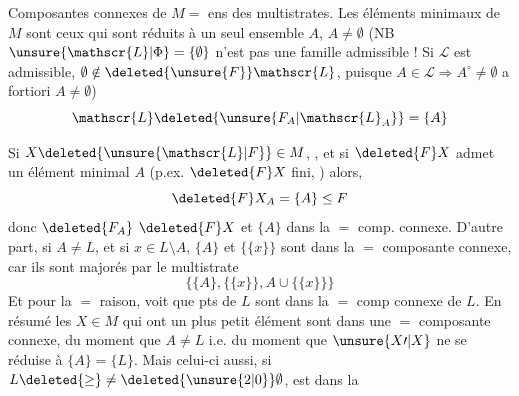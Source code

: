 
Composantes connexes de $M=$ ens des multistrates. Les éléments minimaux de $M$ sont ceux qui sont réduits à un seul ensemble $A$,  $A\ne\emptyset$ (NB $\unsure{\mathscr{L}|\Phi}=\{\emptyset\}$ n'est pas une famille admissible !\deleted{)} Si $\mathscr{L}$ est admissible, $\emptyset\notin\deleted{\unsure{F}}\mathscr{L}$, \deleted{)} puisque $A\in\mathscr{L}\Rightarrow A^{\circ}\ne\emptyset$ a fortiori $A\ne\emptyset$)
\[
\mathscr{L}\deleted{\unsure{F_{A}|\mathscr{L}_{A}}}=\{A\}
\]

 

Si $X\deleted{\unsure{\mathscr{L}|F}}\in M$,  , et si $\deleted{F}X$ admet un  élément minimal $A$ (p.ex. $\deleted{F}X$ fini, ) alors,
\[
\deleted{F}X_A=\{A\}\leq F
\]
 donc $\deleted{F_A}$  $\deleted{F}X$ et $\{A\}$ dans la $=$ comp. connexe. D'autre part,  si $A\ne L$, et si $x\in L\setminus A$, $\{A\}$ et $\{\{x\}\}$ sont dans la $=$ composante connexe, car ils sont majorés par le multistrate
\[
\bigl\{\{A\},\{\{x\}\},A\cup\{\{x\}\}\bigr\}
\]
 Et pour la $=$ raison,    voit que   pts de $L$ sont dans la $=$ comp connexe de $L$. En résumé les $X\in M$ qui ont un plus petit élément  sont dans une $=$ composante connexe, du moment que $A\ne L$ i.e. du moment que $\unsure{X\prime|X}$ ne se réduise à $\{A\}=\{L\}$. Mais celui-ci aussi, si  $L\deleted{\geq}\ne\deleted{\unsure{2|0}}\emptyset$, est dans la
